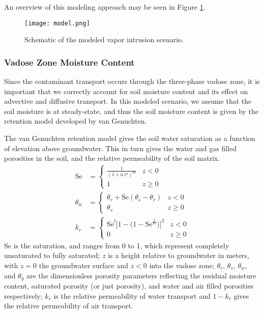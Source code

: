 An overview of this modeling approach may be seen in Figure \ref{fig:model}.\par

\begin{figure}
  \texttt{[image: model.png]}
  \caption{Schematic of the modeled vapor intrusion scenario.}
  \label{fig:model}
\end{figure}

\subsubsection{Vadose Zone Moisture Content}\label{sec:van_genuchten}

Since the contaminant transport occurs through the three-phase vadose zone, it is important that we correctly account for soil moisture content and its effect on advective and diffusive transport.
In this modeled scenario, we assume that the soil moisture is at steady-state, and thus the soil moisture content is given by the retention model developed by van Genuchten\cite{van_genuchten_closed-form_1980}.\par

The van Genuchten retention model gives the soil water saturation as a function of elevation above groundwater.
This in turn gives the water and gas filled porosities in the soil, and the relative permeability of the soil matrix.
\begin{align}
  \mathrm{Se} &=
    \begin{cases}\label{eq:van_genuchten_saturation}
      \frac{1}{(1 + \alpha z^n)^m} & z < 0 \\
    1 & z \geq 0
    \end{cases} \\
  \theta_w &=
    \begin{cases}\label{eq:van_genuchten_soil_moisture}
      \theta_r + \mathrm{Se}(\theta_s - \theta_r) & z < 0 \\
      \theta_s & z \geq 0
    \end{cases} \\
  k_r &=
    \begin{cases}\label{eq:van_genuchten_relative_permeability}
      \mathrm{Se}^l \big[ 1 - \big( 1 - \mathrm{Se}^\frac{1}{m} \big) \big]^2 & z < 0 \\
      0 & z \geq 0
    \end{cases}
\end{align}
$\mathrm{Se}$ is the saturation, and ranges from 0 to 1, which represent completely unsaturated to fully saturated;
$z$ is a height relative to groundwater in meters, with $z=0$ the groundwater surface and $z<0$ into the vadose zone;
$\theta_r$, $\theta_s$, $\theta_w$, and $\theta_g$ are the dimensionless porosity parameters reflecting the residual moisture content, saturated porosity (or just porosity), and water and air filled porosities respectively;
$k_r$ is the relative permeability of water transport and $1-k_r$ gives the relative permeability of air transport.\par


